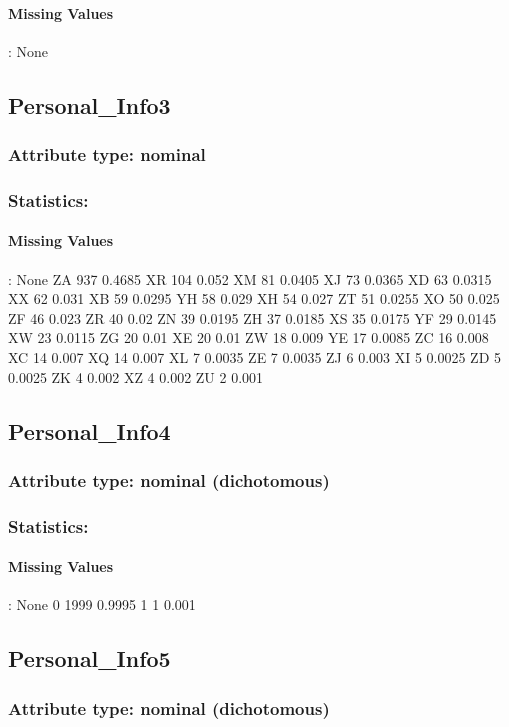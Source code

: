 \paragraph{Missing Values}: None

\subsection{Personal\_Info3}
\subsubsection{Attribute type: nominal}
\subsubsection{Statistics: }
\paragraph{Missing Values}: None
ZA	937	0.4685
XR	104	0.052
XM	81	0.0405
XJ	73	0.0365
XD	63	0.0315
XX	62	0.031
XB	59	0.0295
YH	58	0.029
XH	54	0.027
ZT	51	0.0255
XO	50	0.025
ZF	46	0.023
ZR	40	0.02
ZN	39	0.0195
ZH	37	0.0185
XS	35	0.0175
YF	29	0.0145
XW	23	0.0115
ZG	20	0.01
XE	20	0.01
ZW	18	0.009
YE	17	0.0085
ZC	16	0.008
XC	14	0.007
XQ	14	0.007
XL	7	0.0035
ZE	7	0.0035
ZJ	6	0.003
XI	5	0.0025
ZD	5	0.0025
ZK	4	0.002
XZ	4	0.002
ZU	2	0.001

\subsection{Personal\_Info4}
\subsubsection{Attribute type: nominal (dichotomous)}
\subsubsection{Statistics: }
\paragraph{Missing Values}: None
0	1999	0.9995
1	1	0.001
\subsection{Personal\_Info5}
\subsubsection{Attribute type: nominal (dichotomous)}
